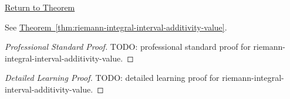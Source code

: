 \newpage
{}
\label{prf:riemann-integral-interval-additivity-value}

\begin{remark*}[Return]
\hyperref[thm:riemann-integral-interval-additivity-value]{Return to Theorem}
\end{remark*}

\begin{theorem*}
See \hyperref[thm:riemann-integral-interval-additivity-value]{Theorem~\ref*{thm:riemann-integral-interval-additivity-value}}.
\end{theorem*}

\begin{proof}[Professional Standard Proof]
\LRAProofBodyStart
TODO: professional standard proof for riemann-integral-interval-additivity-value.
\end{proof}

\begin{proof}[Detailed Learning Proof]
\LRAProofBodyStart
TODO: detailed learning proof for riemann-integral-interval-additivity-value.
\end{proof}

\begin{remark*}
\end{remark*}

\begin{dependencies}
\NoLocalDependencies
\end{dependencies}

\clearpage
